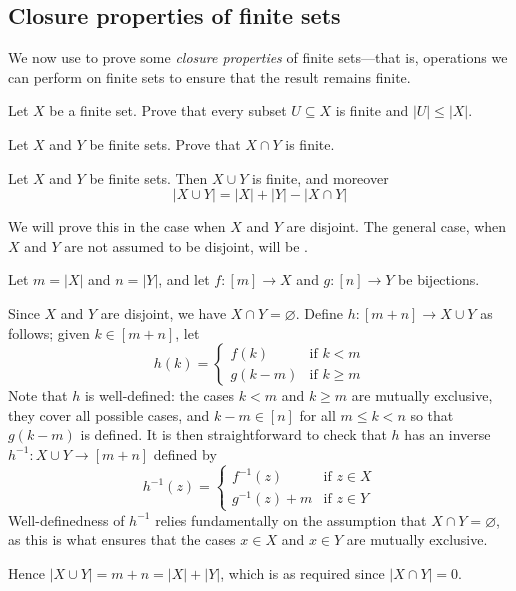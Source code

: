 \subsection*{Closure properties of finite sets}

We now use  to prove some \textit{closure properties} of finite sets---that is, operations we can perform on finite sets to ensure that the result remains finite.

\begin{exercise}
Let $X$ be a finite set. Prove that every subset $U \subseteq X$ is finite and $|U| \le |X|$.
\end{exercise}

\begin{exercise}
Let $X$ and $Y$ be finite sets. Prove that $X \cap Y$ is finite.
\end{exercise}

\begin{proposition}
\label{propUnionOfFiniteSetsIsFinite}
Let $X$ and $Y$ be finite sets. Then $X \cup Y$ is finite, and moreover
\[ |X \cup Y| = |X| + |Y| - |X \cap Y| \]
\end{proposition}

\begin{cproof}
We will prove this in the case when $X$ and $Y$ are disjoint. The general case, when $X$ and $Y$ are not assumed to be disjoint, will be .

Let $m = |X|$ and $n=|Y|$, and let $f : [m] \to X$ and $g : [n] \to Y$ be bijections.

Since $X$ and $Y$ are disjoint, we have $X \cap Y = \varnothing$. Define $h : [m+n] \to X \cup Y$ as follows; given $k \in [m+n]$, let
\[ h(k) = \begin{cases} f(k) & \text{if } k < m \\ g(k-m) & \text{if } k \ge m \end{cases} \]
Note that $h$ is well-defined: the cases $k < m$ and $k \ge m$ are mutually exclusive, they cover all possible cases, and $k-m \in [n]$ for all $m \le k < n$ so that $g(k-m)$ is defined. It is then straightforward to check that $h$ has an inverse $h^{-1} : X \cup Y \to [m+n]$ defined by
\[ h^{-1}(z) = \begin{cases} f^{-1}(z) & \text{if } z \in X \\ g^{-1}(z)+m & \text{if } z \in Y \end{cases} \]
Well-definedness of $h^{-1}$ relies fundamentally on the assumption that $X \cap Y = \varnothing$, as this is what ensures that the cases $x \in X$ and $x \in Y$ are mutually exclusive.

Hence $|X \cup Y| = m+n = |X| + |Y|$, which is as required since $|X \cap Y| = 0$.
\end{cproof}

